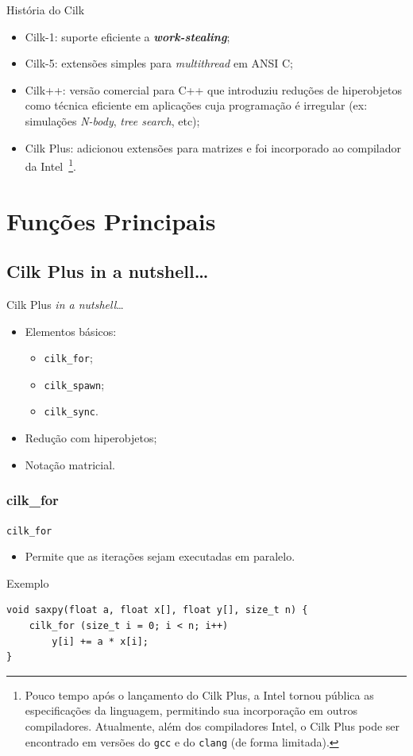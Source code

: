 \documentclass{beamer}
\begin{document}
\begin{frame}{História do Cilk}
\begin{itemize}
    \item Cilk-1: suporte eficiente a \textbf{\textit{work-stealing}};
    \item Cilk-5: extensões simples para \textit{multithread} em ANSI C\@;
    \item Cilk++: versão comercial para C++ que introduziu reduções de
    hiperobjetos como técnica eficiente em aplicações cuja programação é
    irregular (ex: simulações \textit{N-body}, \textit{tree search}, etc);
    \item Cilk Plus: adicionou extensões para matrizes e foi incorporado ao
    compilador da Intel~\footnote{Pouco tempo após o lançamento do Cilk Plus, a
    Intel tornou pública as especificações da linguagem, permitindo sua
    incorporação em outros compiladores. Atualmente, além dos compiladores Intel,
    o Cilk Plus pode ser encontrado em versões do \texttt{gcc} e
    do \texttt{clang} (de forma limitada).}.
\end{itemize}
\end{frame}

\section{Funções Principais}
\subsection{Cilk Plus in a nutshell\ldots}
\begin{frame}{Cilk Plus \textit{in a nutshell}\ldots}
\begin{itemize}
    \item Elementos básicos:
    \begin{itemize}
        \item \texttt{cilk\_for};
        \item \texttt{cilk\_spawn};
        \item \texttt{cilk\_sync}.
    \end{itemize}
    \item Redução com hiperobjetos;
    \item Notação matricial.
\end{itemize}
\end{frame}
\subsubsection{cilk\_for}
\begin{frame}[fragile]{\texttt{cilk\_for}}
\begin{itemize}
    \item Permite que as iterações sejam executadas em paralelo.
\end{itemize}
\begin{block}{Exemplo}
\begin{lstlisting}
void saxpy(float a, float x[], float y[], size_t n) {
    cilk_for (size_t i = 0; i < n; i++)
        y[i] += a * x[i];
}
\end{lstlisting}
\end{block}
\end{frame}
\end{document}
